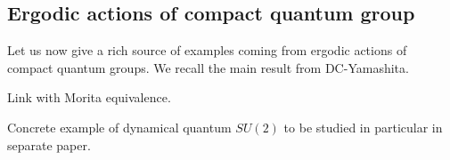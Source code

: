 \subsection{Ergodic actions of compact quantum group}

Let us now give a rich source of examples coming from ergodic actions of compact quantum groups. We recall the main result from DC-Yamashita.

Link with Morita equivalence. 

Concrete example of dynamical quantum $SU(2)$ to be studied in particular in separate paper. 









